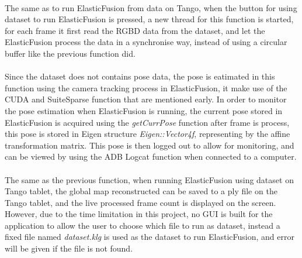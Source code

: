 \documentclass[12pt,twoside]{article}
\begin{document}
\\
The same as to run ElasticFusion from data on Tango, when the button for using dataset to run ElasticFusion is pressed, a new thread for this function is started, for each frame it first read the RGBD data from the dataset, and let the ElasticFusion process the data in a synchronise way, instead of using a circular buffer like the previous function did.\\
\\
Since the dataset does not contains pose data, the pose is eatimated in this function using the camera tracking process in ElasticFusion, it make use of the CUDA and SuiteSparse function that are mentioned early. In order to monitor the pose estimation when ElasticFusion is running, the current pose stored in ElasticFusion is acquired using the \textit{getCurrPose} function after frame is process, this pose is stored in Eigen structure \textit{Eigen::Vector4f}, representing by the affine transformation matrix. This pose is then logged out to allow for monitoring, and can be viewed by using the ADB Logcat function when connected to a computer.\\
\\
The same as the previous function, when running ElasticFusion using dataset on Tango tablet, the global map reconstructed can be saved to a ply file on the Tango tablet, and the live processed frame count is displayed on the screen. However, due to the time limitation in this project, no GUI is built for the application to allow the user to choose which file to run as dataset, instead a fixed file named \textit{dataset.klg} is used as the dataset to run ElasticFusion, and error will be given if the file is not found.\\
\end{document}
